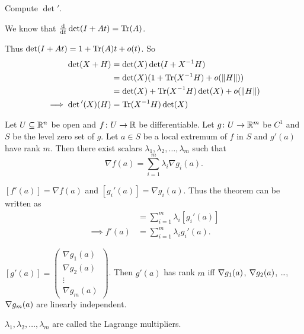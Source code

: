 \begin{exercise*}
    Compute $\det'$.
\end{exercise*}
\begin{solution}
    We know that $\odv{}{t} \det(I + At) = \Tr(A)$.
    \TODO[Why?]

    Thus $\det(I + At) = 1 + \operatorname{Tr}(A)t + o(t)$.
    So \begin{align*}
        \det(X + H) &= \det(X) \det(I + X^{-1}H) \\
        &= \det(X) (1 + \operatorname{Tr}(X^{-1}H) + o(\lVert H\rVert)) \\
        &= \det(X) + \operatorname{Tr}(X^{-1}H) \det(X) + o(\lVert H\rVert) \\
        \implies \det{}'(X)(H) &= \operatorname{Tr}(X^{-1}H) \det(X)
    \end{align*}
\end{solution}


\begin{theorem*} \label{thm:lm}
    Let $U \subseteq \mathbb{R}^n$ be open and $f\colon U \to \mathbb{R}$ be differentiable.
    Let $g\colon U \to \mathbb{R}^m$ be $C^1$ and $S$ be the level zero set of $g$.
    Let $a \in S$ be a local extremum of $f$ in $S$ and $g'(a)$ have rank
    $m$.
    Then there exist scalars $\lambda_1, \lambda_2, \dots, \lambda_m$ such
    that \[
        \nabla f(a) = \sum_{i=1}^m \lambda_i \nabla g_i(a).
    \]
\end{theorem*}
\begin{remarks}
    \item $[f'(a)] = \nabla f(a)$ and $[g_i'(a)] = \nabla g_i(a)$.
    Thus the theorem can be written as \begin{align*}
        [f'(a)] &= \sum_{i=1}^m \lambda_i [g_i'(a)] \\
        \implies f'(a) &= \sum_{i=1}^m \lambda_i g_i'(a).
    \end{align*}
    \item $[g'(a)] = \begin{pmatrix}
        \nabla g_1(a) \\
        \nabla g_2(a) \\
        \vdots \\
        \nabla g_m(a)
    \end{pmatrix}$.
    Then $g'(a)$ has rank $m$ iff $\nabla g_1(a)$, $\nabla g_2(a)$, \dots,
    $\nabla g_m(a)$ are linearly independent.
    \item $\lambda_1, \lambda_2, \dots, \lambda_m$ are called the
    Lagrange multipliers.
\end{remarks}


